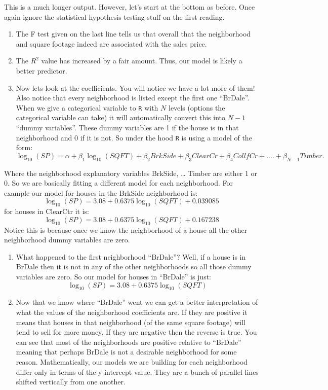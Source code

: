 \documentclass[
]{book}
\theoremstyle{definition}
\theoremstyle{definition}
\theoremstyle{definition}
\theoremstyle{definition}
\theoremstyle{remark}
\begin{document}
This is a much longer output. However, let's start at the bottom as before. Once again ignore the statistical hypothesis testing stuff on the first reading.

\begin{enumerate}
\def\labelenumi{\arabic{enumi}.}
\item
  The F test given on the last line tells us that overall that the neighborhood and square footage indeed are associated with the sales price.
\item
  The \(R^2\) value has increased by a fair amount. Thus, our model is likely a better predictor.
\item
  Now lets look at the coefficients. You will notice we have a lot more of them! Also notice that every neighborhood is listed except the first one ``BrDale''. When we give a categorical variable to \texttt{R} with \(N\) levels (options the categorical variable can take) it will automatically convert this into \(N-1\) ``dummy variables''. These dummy variables are 1 if the house is in that neighborhood and 0 if it is not. So under the hood \texttt{R} is using a model of the form: \[ \log_{10}(SP)=\alpha+\beta_1 \log_{10}(SQFT)+\beta_2 BrkSide+ \beta_3 ClearCr+\beta_4 CollfCr+....+ \beta_{N-1} Timber.\]
\end{enumerate}

Where the neighborhood explanatory variables BrkSide, \ldots{} Timber are either 1 or 0. So we are basically fitting a different model for each neighborhood. For example our model for houses in the BrkSide neighborhood is: \[\log_{10}(SP)=3.08+0.6375 \log_{10}(SQFT)+0.039085\] for houses in ClearCtr it is: \[\log_{10}(SP)=3.08+0.6375 \log_{10}(SQFT)+0.167238\]
Notice this is because once we know the neighborhood of a house all the other neighborhood dummy variables are zero.

\begin{enumerate}
\def\labelenumi{\arabic{enumi}.}
\setcounter{enumi}{3}
\item
  What happened to the first neighborhood ``BrDale''? Well, if a house is in BrDale then it is not in any of the other neighborhoods so all those dummy variables are zero. So our model for houses in ``BrDale'' is just:\[ \log_{10}(SP)=3.08+0.6375 \log_{10}(SQFT) \]
\item
  Now that we know where ``BrDale'' went we can get a better interpretation of what the values of the neighborhood coefficients are. If they are positive it means that houses in that neighborhood (of the same square footage) will tend to sell for more money. If they are negative then the reverse is true. You can see that most of the neighborhoods are positive relative to ``BrDale'' meaning that perhaps BrDale is not a desirable neighborhood for some reason. Mathematically, our models we are building for each neighborhood differ only in terms of the y-intercept value. They are a bunch of parallel lines shifted vertically from one another.
\end{enumerate}
\end{document}
